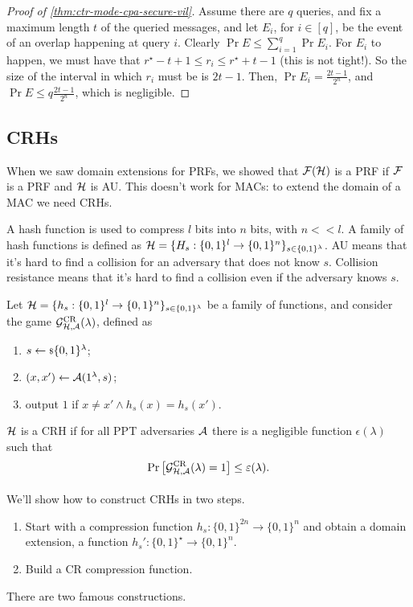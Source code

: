 \begin{proof}[Proof of \cref{thm:ctr-mode-cpa-secure-vil}]
	Assume there are $q$ queries, and fix a maximum length $t$ of the queried messages, and let $E_i$, for $i \in [q]$, be the event of an overlap happening at query $i$.
	Clearly $\Pr{E} \le \sum_{i=1}^{q} \Pr{E_i}$.
	For $E_i$ to happen, we must have that $r^{\star} - t + 1 \le r_i \le r^{\star} + t - 1$ (this is not tight!).
	So the size of the interval in which $r_i$ must be is $2t-1$.
	Then, $\Pr{E_i} = \frac{2t - 1}{2^n}$, and $\Pr{E} \le q \frac{2t - 1}{2^n}$, which is negligible.
\end{proof}

\subsection{\aclp{CRH}}

When we saw domain extensions for \acp{PRF}, we showed that $\mathcal{F}(\mathcal{H})$ is a \ac{PRF} if $\mathcal{F}$ is a \ac{PRF} and $\mathcal{H}$ is \ac{AU}.
This doesn't work for \acp{MAC}: to extend the domain of a \ac{MAC} we need \acp{CRH}.

A hash function is used to compress $l$ bits into $n$ bits, with $n << l$.
A family of hash functions is defined as $\mathcal{H} = \{ H_s : \{0,1\}^{l} \to \{0,1\}^{n}\}_{s \in \{0,1\}^{\lambda}}$.
\ac{AU} means that it's hard to find a collision for an adversary that does not know $s$.
Collision resistance means that it's hard to find a collision even if the adversary knows $s$.

\begin{definition}
	Let $\mathcal{H} = \{h_s : \{0,1\}^{l} \to \{0,1\}^{n}\}_{s \in \{0,1\}^{\lambda}}$ be a family of functions, and consider the game $\mathcal{G}^{\scriptstyle \text{CR}}_{\mathcal{H},\mathcal{A}}(\lambda)$, defined as
	\begin{enumerate}
		\item $s \leftarrow {\scriptstyle \$} {\{0,1\}^{\lambda}}$;
		\item $(x,x') \leftarrow \mathcal{A} (1^{\lambda}, s)$;
		\item output $1$ if $x \neq x' \land h_s(x) = h_s(x')$.
	\end{enumerate}
	$\mathcal{H}$ is a \ac{CRH} if for all \ac{PPT} adversaries $\mathcal{A}$ there is a negligible function $\epsilon(\lambda)$ such that
	\begin{equation*}
		\mathop{\mathrm{Pr}}\limits_{} \left[ {\mathcal{G}^{\scriptstyle \text{CR}}_{\mathcal{H},\mathcal{A}}(\lambda) = 1} \right] \le \varepsilon(\lambda). \qedhere
	\end{equation*}
\end{definition}

We'll show how to construct \acp{CRH} in two steps.
\begin{enumerate}
	\item Start with a compression function $h_s : \{0,1\}^{2n} \to \{0,1\}^{n}$ and obtain a domain extension, \ie a function $h_s' : \{0,1\}^{\star} \to \{0,1\}^{n}$.
	\item Build a \ac{CR} compression function.
\end{enumerate}
There are two famous constructions.

